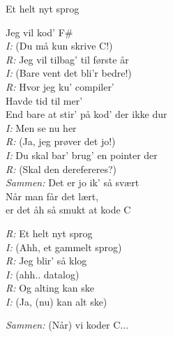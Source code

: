 \begin{song}{Et helt nyt sprog}
\begin{SBVerse}
    Jeg vil kod' F\#  \\
    \emph{I:} (Du må kun skrive C!) \\
    \emph{R:} Jeg vil tilbag' til første år \\
    \emph{I:} (Bare vent det bli'r bedre!) \\
    \emph{R:} Hvor jeg ku' compiler' \\
    Havde tid til mer' \\
    End bare at stir' på kod' der ikke dur \\\medskip
    \emph{I:} Men se nu her \\
    \emph{R:} (Ja, jeg prøver det jo!) \\
    \emph{I:} Du skal bar' brug' en pointer der \\
    \emph{R:} (Skal den derefereres?) \\
    \emph{Sammen:} Det er jo ik' så svært \\
    Når man får det lært, \\
    er det åh så smukt at kode C
  \end{SBVerse}
  \begin{SBChorus}
    \emph{R:} Et helt nyt sprog  \\
    \emph{I:} (Ahh, et gammelt sprog) \\
    \emph{R:} Jeg blir' så klog \\
    \emph{I:} (ahh.. datalog) \\
    \emph{R:} Og alting kan ske \\
    \emph{I:} (Ja, (nu) kan alt ske)
  \end{SBChorus}

  \begin{SBSection*}
    \emph{Sammen:} (Når) vi koder C...
  \end{SBSection*}
\end{song}